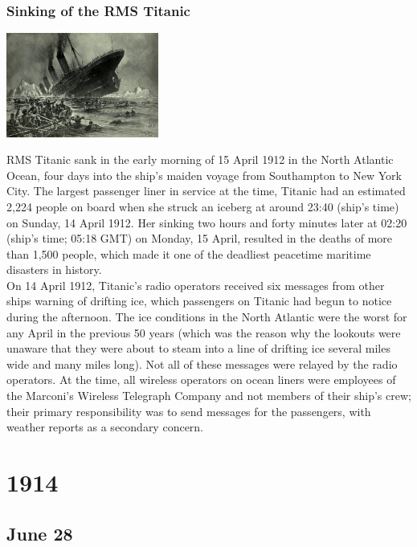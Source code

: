 \documentclass[11pt]{report}
\begin{document}
\subsection{Sinking of the RMS Titanic}
\vspace{2mm}\begin{center}\includegraphics[width=5cm]{./img/titanicsinking.jpg}\end{center}
RMS Titanic sank in the early morning of 15 April 1912 in the North Atlantic Ocean, four days into the ship's maiden voyage from Southampton to New York City. The largest passenger liner in service at the time, Titanic had an estimated 2,224 people on board when she struck an iceberg at around 23:40 (ship's time) on Sunday, 14 April 1912. Her sinking two hours and forty minutes later at 02:20 (ship's time; 05:18 GMT) on Monday, 15 April, resulted in the deaths of more than 1,500 people, which made it one of the deadliest peacetime maritime disasters in history.\\

On 14 April 1912, Titanic's radio operators received six messages from other ships warning of drifting ice, which passengers on Titanic had begun to notice during the afternoon. The ice conditions in the North Atlantic were the worst for any April in the previous 50 years (which was the reason why the lookouts were unaware that they were about to steam into a line of drifting ice several miles wide and many miles long). Not all of these messages were relayed by the radio operators. At the time, all wireless operators on ocean liners were employees of the Marconi's Wireless Telegraph Company and not members of their ship's crew; their primary responsibility was to send messages for the passengers, with weather reports as a secondary concern.

\chapter{1914}
\section{June 28}
\end{document}
